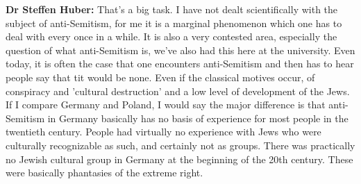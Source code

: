 \textbf{Dr Steffen Huber:} That's a big task. I have not dealt scientifically with the subject of anti-Semitism, for me it is a marginal phenomenon which one has to deal with every once in a while. It is also a very contested area, especially the question of what anti-Semitism is, we’ve also had this here at the university. Even today, it is often the case that one encounters anti-Semitism and then has to hear people say that tit would be none. Even if the classical motives occur, of conspiracy and 'cultural destruction' and a low level of development of the Jews. \\
If I compare Germany and Poland, I would say the major difference is that anti-Semitism in Germany basically has no basis of experience for most people in the twentieth century. People had virtually no experience with Jews who were culturally recognizable as such, and certainly not as groups. There was practically no Jewish cultural group in Germany at the beginning of the 20th century. These were basically phantasies of the extreme right.\\
